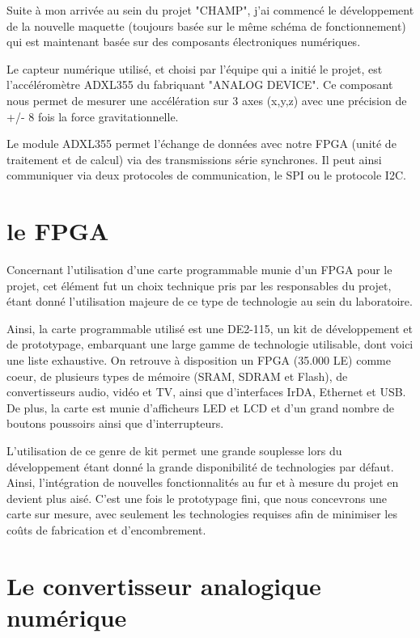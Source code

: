 \documentclass[french,a4paper,12pt]{report}
\begin{document}
 
Suite à mon arrivée au sein du projet "CHAMP", j'ai commencé le développement de la nouvelle maquette (toujours basée sur le même schéma de fonctionnement) qui est maintenant basée sur des composants électroniques numériques.
 
Le capteur numérique utilisé, et choisi par l'équipe qui a initié le projet, est l'accéléromètre ADXL355 du fabriquant "ANALOG DEVICE". Ce composant nous permet de mesurer une accélération sur 3 axes (x,y,z) avec une précision de +/- 8 fois la force gravitationnelle.
 
Le module ADXL355 permet l'échange de données avec notre FPGA (unité de traitement et de calcul) via des transmissions série synchrones. Il peut ainsi communiquer via deux protocoles de communication, le SPI ou le protocole I2C.
			
			\section{le FPGA}
			
			Concernant l'utilisation d'une carte programmable munie d'un FPGA pour le projet, cet élément fut un choix technique pris par les responsables du projet, étant donné l'utilisation majeure de ce type de technologie au sein du laboratoire.
			
			Ainsi, la carte programmable utilisé est une DE2-115, un kit de développement et de prototypage, embarquant une large gamme de technologie utilisable, dont voici une liste exhaustive. On retrouve à disposition un FPGA (35.000 LE) comme coeur, de plusieurs types de mémoire (SRAM, SDRAM et Flash), de convertisseurs audio, vidéo et TV, ainsi que d'interfaces IrDA, Ethernet et USB. De plus, la carte est munie d'afficheurs LED et LCD et d'un grand nombre de boutons poussoirs ainsi que d'interrupteurs.
			
			L'utilisation de ce genre de kit permet une grande souplesse lors du développement étant donné la grande disponibilité de technologies par défaut. Ainsi, l'intégration de nouvelles fonctionnalités au fur et à mesure du projet en devient plus aisé. C'est une fois le prototypage fini, que nous concevrons une carte sur mesure, avec seulement les technologies requises afin de minimiser les coûts de fabrication et d'encombrement.
			
			\section{Le convertisseur analogique numérique}
			
\end{document}

